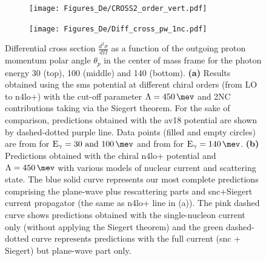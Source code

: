     \begin{figure}[h]
        \centering
        \begin{subfigure}[t]{0.46\textwidth}
            \caption{}
            \texttt{[image: Figures\_De/CROSS2\_order\_vert.pdf]}
            \label{Diff_cross_order}
        \end{subfigure}
        \begin{subfigure}[t]{0.46\textwidth}
            \caption{}
            \texttt{[image: Figures\_De/Diff\_cross\_pw\_1nc.pdf]}
            \label{Diff_cross_pw_1nc}
        \end{subfigure}
        \caption{Differential cross section $\frac{d^2\sigma}{d\Omega}$
        as a function of the outgoing proton momentum polar angle $\theta_p$ in the center of mass frame 
        for the photon energy \SI{30}{\mev} (top), \SI{100}{\mev} (middle) and \SI{140}{\mev} (bottom).
        {\bf (a)} Results obtained using the \gls{sms} potential
        at different chiral orders (from LO to \gls{n4lo+}) with the cut-off parameter $\Lambda=\SI{450}{\mev}$ and 
        2NC contributions taking via the Siegert theorem.
        For the sake of comparison, predictions obtained with the \gls*{av18} potential are shown
        by dashed-dotted purple line.
        Data points (filled and empty circles) are from \cite{Ying_Experiment_Deut}
        for $\text{E}_\gamma=\SIlist[list-units = single]{30; 100}{\mev}$
        and from \cite{DeSanctis_Experiment_Deut} for $\text{E}_\gamma=\SI{140}{\mev}$.
        {\bf (b)} Predictions obtained with the chiral \gls{n4lo+} potential and $\Lambda=\SI{450}{\mev}$
        with various models of nuclear current and scattering state.
        The blue solid curve represents our most complete predictions
        comprising the plane-wave plus rescattering parts and \gls{snc}+Siegert current propagator 
        (the same as \gls{n4lo+} line in (a)).
        The pink dashed curve shows predictions obtained with
        the single-nucleon current only (without applying the Siegert theorem) and the green dashed-dotted
        curve represents predictions with the full current (\gls{snc} + Siegert) but plane-wave part only.
        }
        \label{Diff_cross_order_pw}
    \end{figure}


